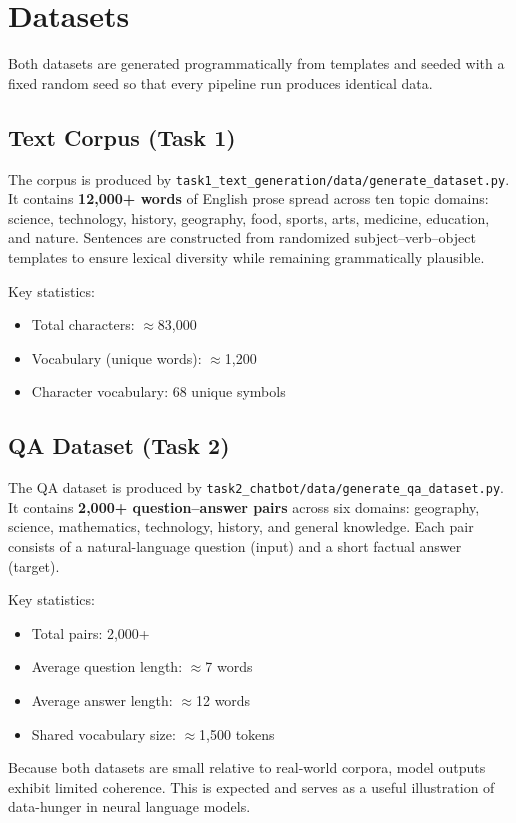 \section{Datasets}
\label{sec:datasets}

Both datasets are generated programmatically from templates and seeded with a
fixed random seed so that every pipeline run produces identical data.

\subsection{Text Corpus (Task 1)}

The corpus is produced by \texttt{task1\_text\_generation/data/generate\_dataset.py}.
It contains \textbf{12,000+ words} of English prose spread across ten topic domains:
science, technology, history, geography, food, sports, arts, medicine, education,
and nature. Sentences are constructed from randomized subject–verb–object templates
to ensure lexical diversity while remaining grammatically plausible.

Key statistics:
\begin{itemize}
    \item Total characters: $\approx$83,000
    \item Vocabulary (unique words): $\approx$1,200
    \item Character vocabulary: 68 unique symbols
\end{itemize}

\subsection{QA Dataset (Task 2)}

The QA dataset is produced by \texttt{task2\_chatbot/data/generate\_qa\_dataset.py}.
It contains \textbf{2,000+ question–answer pairs} across six domains: geography,
science, mathematics, technology, history, and general knowledge. Each pair consists
of a natural-language question (input) and a short factual answer (target).

Key statistics:
\begin{itemize}
    \item Total pairs: 2,000+
    \item Average question length: $\approx$7 words
    \item Average answer length: $\approx$12 words
    \item Shared vocabulary size: $\approx$1,500 tokens
\end{itemize}

Because both datasets are small relative to real-world corpora, model outputs
exhibit limited coherence. This is expected and serves as a useful illustration
of data-hunger in neural language models.

